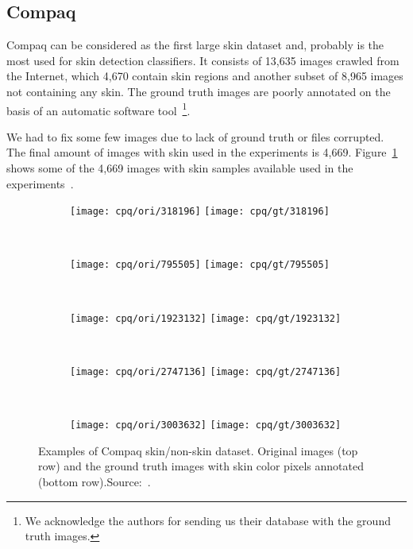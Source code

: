 \subsection{Compaq}
\label{sec:datasets_compaq}
Compaq can be considered as the first large skin dataset and, probably is the most used for skin detection classifiers. It consists of 13,635 images crawled from the Internet, which 4,670 contain skin regions and another subset of 8,965 images not containing any skin. The ground truth images are poorly annotated on the basis of an automatic software tool~\citep{mahmoodi:16}\footnote{We acknowledge the authors for sending us their database with the ground truth images.}.

 We had to fix some few images due to lack of ground truth or files corrupted. The final amount of images with skin used in the experiments is 4,669. Figure~\ref{fig:compaq_dataset_example} shows some of the 4,669 images with skin samples available used in the experiments~\citep{jones:02}.

\begin{figure}[H]
    \centering
    \begin{subfigure}[t]{0.269\textwidth}
        \texttt{[image: cpq/ori/318196]}
        \texttt{[image: cpq/gt/318196]}
    \end{subfigure}
    ~
    \begin{subfigure}[t]{0.214\textwidth}
        \texttt{[image: cpq/ori/795505]}
        \texttt{[image: cpq/gt/795505]}
    \end{subfigure}
    ~
    \begin{subfigure}[t]{0.132\textwidth}
        \texttt{[image: cpq/ori/1923132]}
        \texttt{[image: cpq/gt/1923132]}
    \end{subfigure}
    ~
    \begin{subfigure}[t]{0.14\textwidth}
        \texttt{[image: cpq/ori/2747136]}
        \texttt{[image: cpq/gt/2747136]}
    \end{subfigure}
    ~
    \begin{subfigure}[t]{0.12\textwidth}
        \texttt{[image: cpq/ori/3003632]}
        \texttt{[image: cpq/gt/3003632]}
    \end{subfigure}
    \caption[Examples of Compaq skin/non-skin dataset]{Examples of Compaq skin/non-skin dataset. Original images (top row) and the ground truth images with skin color pixels annotated (bottom row).Source:~\citet{jones:02}.}
    \label{fig:compaq_dataset_example}
\end{figure}



